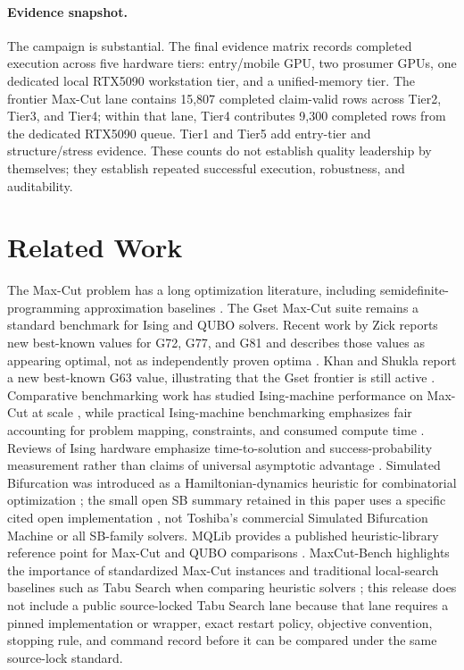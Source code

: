 \documentclass[11pt]{article}
\begin{document}
\paragraph{Evidence snapshot.}
The campaign is substantial. The final evidence matrix records completed execution across five hardware tiers: entry/mobile GPU, two prosumer GPUs, one dedicated local RTX5090 workstation tier, and a unified-memory tier. The frontier Max-Cut lane contains 15,807 completed claim-valid rows across Tier2, Tier3, and Tier4; within that lane, Tier4 contributes 9,300 completed rows from the dedicated RTX5090 queue. Tier1 and Tier5 add entry-tier and structure/stress evidence. These counts do not establish quality leadership by themselves; they establish repeated successful execution, robustness, and auditability.

\section{Related Work}
The Max-Cut problem has a long optimization literature, including semidefinite-programming approximation baselines \cite{goemans1995maxcut}. The Gset Max-Cut suite remains a standard benchmark for Ising and QUBO solvers. Recent work by Zick reports new best-known values for G72, G77, and G81 and describes those values as appearing optimal, not as independently proven optima \cite{zick2025}. Khan and Shukla report a new best-known G63 value, illustrating that the Gset frontier is still active \cite{khan2025g63}. Comparative benchmarking work has studied Ising-machine performance on Max-Cut at scale \cite{shaglel2025maxcut}, while practical Ising-machine benchmarking emphasizes fair accounting for problem mapping, constraints, and consumed compute time \cite{ohno2024qkp}. Reviews of Ising hardware emphasize time-to-solution and success-probability measurement rather than claims of universal asymptotic advantage \cite{mohseni2022ising}. Simulated Bifurcation was introduced as a Hamiltonian-dynamics heuristic for combinatorial optimization \cite{goto2019sb}; the small open SB summary retained in this paper uses a specific cited open implementation \cite{openSB}, not Toshiba's commercial Simulated Bifurcation Machine or all SB-family solvers. MQLib provides a published heuristic-library reference point for Max-Cut and QUBO comparisons \cite{dunning2018mqlib}. MaxCut-Bench highlights the importance of standardized Max-Cut instances and traditional local-search baselines such as Tabu Search when comparing heuristic solvers \cite{nath2024maxcutbench}; this release does not include a public source-locked Tabu Search lane because that lane requires a pinned implementation or wrapper, exact restart policy, objective convention, stopping rule, and command record before it can be compared under the same source-lock standard.
\end{document}
